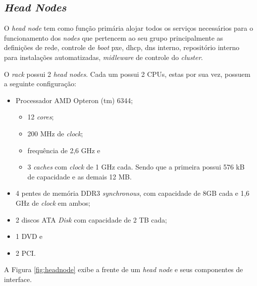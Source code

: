    
\subsection{\textit{Head Nodes}}

O \textit{head node} tem como função primária alojar todos os serviços necessários para o funcionamento dos \textit{nodes} que pertencem ao seu grupo principalmente as definições de rede, controle de \textit{boot} pxe, dhcp, dns interno, repositório interno para instalações automatizadas, \textit{midleware} de controle do \textit{cluster}.

    O \textit{rack} possui 2 \textit{head nodes}. Cada um possui 2 CPUs, estas por sua vez, possuem a seguinte configuração:

    \begin{itemize}
    
    \item Processador AMD Opteron (tm) 6344;
    
        \begin{itemize}
        \item 12 \textit{cores};
        \item 200 MHz de \textit{clock};
        \item frequência de 2,6 GHz e
        \item 3 \textit{caches} com \textit{clock} de 1 GHz cada. Sendo que a primeira possui 576 kB de capacidade e as demais 12 MB.
        \end{itemize}
        
    \item 4 pentes de memória DDR3 \textit{synchronous}, com capacidade de 8GB cada e 1,6 GHz de \textit{clock} em ambos;

    \item 2 discos ATA \textit{Disk} com capacidade de 2 TB cada;
    \item 1 DVD e 
    \item 2 PCI.

    \end{itemize}
    
A Figura \ref{fig:headnode} exibe a frente de um \textit{head node} e seus componentes de interface.

